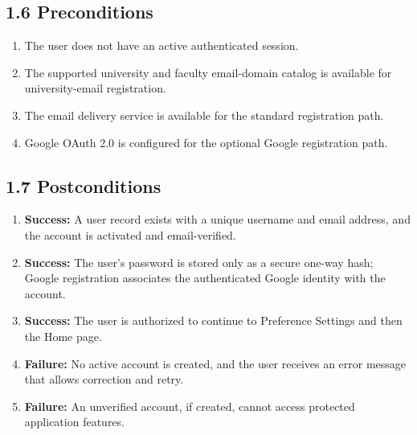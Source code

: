 \documentclass[12pt]{article}
\begin{document}
\subsection*{1.6 Preconditions}
\par\medskip
\begin{enumerate}
\item The user does not have an active authenticated session.
\item The supported university and faculty email-domain catalog is available for university-email registration.
\item The email delivery service is available for the standard registration path.
\item Google OAuth 2.0 is configured for the optional Google registration path.
\end{enumerate}
\par\medskip
\hypertarget{sec:1-7-postconditions}{}
\subsection*{1.7 Postconditions}
\par\medskip
\begin{enumerate}
\item \textbf{Success:} A user record exists with a unique username and email address, and the account is activated and email-verified.
\item \textbf{Success:} The user's password is stored only as a secure one-way hash; Google registration associates the authenticated Google identity with the account.
\item \textbf{Success:} The user is authorized to continue to Preference Settings and then the Home page.
\item \textbf{Failure:} No active account is created, and the user receives an error message that allows correction and retry.
\item \textbf{Failure:} An unverified account, if created, cannot access protected application features.
\end{enumerate}
\par\medskip
\hypertarget{sec:1-8-extension-points}{}
\end{document}
